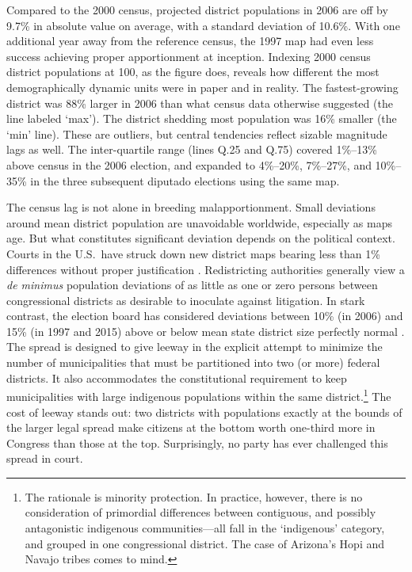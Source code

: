 \documentclass[letter,12pt]{article}
\begin{document}
Compared to the 2000 census, projected district populations in 2006 are off by 9.7\% in absolute value on average, with a standard deviation of 10.6\%. With one additional year away from the reference census, the 1997 map had even less success achieving proper apportionment at inception. Indexing 2000 census district populations at 100, as the figure does, reveals how different the most demographically dynamic units were in paper and in reality. The fastest-growing district was 88\% larger in 2006 than what census data otherwise suggested (the line labeled `max'). The district shedding most population was 16\% smaller (the `min' line). These are outliers, but central tendencies reflect sizable magnitude lags as well. The inter-quartile range (lines Q.25 and Q.75) covered 1\%--13\% above census in the 2006 election, and expanded to 4\%--20\%, 7\%--27\%, and 10\%--35\% in the three subsequent diputado elections using the same map. 


The census lag is not alone in breeding malapportionment. Small deviations around mean district population are unavoidable worldwide, especially as maps age. But what constitutes significant deviation depends on the political context. Courts in the U.S.\ have struck down new district maps bearing less than 1\% differences without proper justification \citep{tuckerApportionment.1985}. Redistricting authorities generally view a \emph{de minimus} population deviations of as little as one or zero persons between congressional districts as desirable to inoculate against litigation. In stark contrast, the election board has considered deviations between 10\% (in 2006) and 15\% (in 1997 and 2015) above or below mean state district size perfectly normal \citep{lujambio.vives.2008,trelles.mtz.polygob2012}. The spread is designed to give leeway in the explicit attempt to minimize the number of municipalities that must be partitioned into two (or more) federal districts. It also accommodates the constitutional requirement to keep municipalities with large indigenous populations within the same district.\footnote{The rationale is minority protection. In practice, however, there is no consideration of primordial differences between contiguous, and possibly antagonistic indigenous communities---all fall in the `indigenous' category, and grouped in one congressional district. The case of Arizona's Hopi and Navajo tribes comes to mind.} The cost of leeway stands out: two districts with populations exactly at the bounds of the larger legal spread make citizens at the bottom worth one-third more in Congress than those at the top. Surprisingly, no party has ever challenged this spread in court. 
\end{document}
